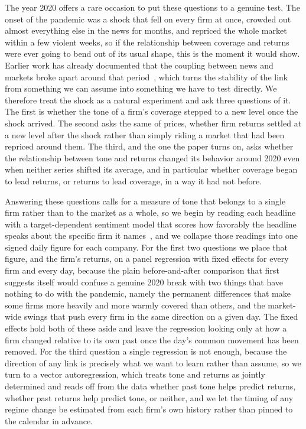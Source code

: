 \documentclass[conference]{IEEEtran}
\begin{document}
The year 2020 offers a rare occasion to put these questions to a genuine test. The
onset of the pandemic was a shock that fell on every firm at once, crowded out almost
everything else in the news for months, and repriced the whole market within a few
violent weeks, so if the relationship between coverage and returns were ever going to
bend out of its usual shape, this is the moment it would show. Earlier work has already
documented that the coupling between news and markets broke apart around that
period~\cite{glasserman2024}, which turns the stability of the link from something we can
assume into something we have to test directly. We therefore treat the shock as a
natural experiment and ask three questions of it. The first is whether the tone of a
firm's coverage stepped to a new level once the shock arrived. The second asks the same
of prices, whether firm returns settled at a new level after the shock rather than
simply riding a market that had been repriced around them. The third, and the one the
paper turns on, asks whether the relationship between tone and returns changed its
behavior around 2020 even when neither series shifted its average, and in particular
whether coverage began to lead returns, or returns to lead coverage, in a way it had
not before.

Answering these questions calls for a measure of tone that belongs to a single firm
rather than to the market as a whole, so we begin by reading each headline with a
target-dependent sentiment model that scores how favorably the headline speaks about the
specific firm it names~\cite{hamborg2021}, and we collapse those readings into one
signed daily figure for each company. For the first two questions we place that figure,
and the firm's returns, on a panel regression with fixed effects for every firm and
every day, because the plain before-and-after comparison that first suggests itself
would confuse a genuine 2020 break with two things that have nothing to do with the
pandemic, namely the permanent differences that make some firms more heavily and more
warmly covered than others, and the market-wide swings that push every firm in the same
direction on a given day. The fixed effects hold both of these aside and leave the
regression looking only at how a firm changed relative to its own past once the day's
common movement has been removed. For the third question a single regression is not
enough, because the direction of any link is precisely what we want to learn rather than
assume, so we turn to a vector autoregression, which treats tone and returns as jointly
determined and reads off from the data whether past tone helps predict returns, whether
past returns help predict tone, or neither, and we let the timing of any regime change be
estimated from each firm's own history rather than pinned to the calendar in advance.
\end{document}

